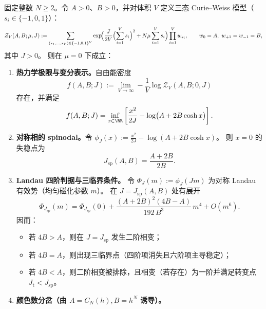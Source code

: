 \begin{theorem}\label{thm:xi-hdqcd-cw-tricritical}
固定整数 \(N\ge 2\)。令 \(A>0\)、\(B>0\)，并对体积 \(V\) 定义三态 Curie--Weiss 模型（\(s_i\in\{-1,0,1\}\)）：
\begin{equation}\label{eq:xi-hdqcd-cw-partition}
\mathcal Z_{V}(A,B;\mu,J)
:=
\sum_{(s_1,\dots,s_V)\in\{-1,0,1\}^{V}}
\exp\!\Bigl(\frac{J}{2V}\Bigl(\sum_{i=1}^{V}s_i\Bigr)^{2}+N\mu\sum_{i=1}^{V}s_i\Bigr)
\prod_{i=1}^{V} w_{s_i},
\qquad
w_0=A,\ w_{+1}=w_{-1}=B,
\end{equation}
其中 \(J>0\)。
则在 \(\mu=0\) 下成立：
\begin{enumerate}
  \item \textbf{热力学极限与变分表示。}自由能密度
  \[
  f(A,B;J):=\lim_{V\to\infty}-\frac{1}{V}\log\mathcal Z_V(A,B;0,J)
  \]
  存在，并满足
  \begin{equation}\label{eq:xi-hdqcd-cw-variational}
  f(A,B;J)=\inf_{x\in\RR}\left[\frac{x^{2}}{2J}-\log\bigl(A+2B\cosh x\bigr)\right].
  \end{equation}
  \item \textbf{对称相的 spinodal。}令
  \(
  \phi_J(x):=\frac{x^{2}}{2J}-\log(A+2B\cosh x)
  \)。
  则 \(x=0\) 的失稳点为
  \begin{equation}\label{eq:xi-hdqcd-cw-spinodal}
  J_{\mathrm{sp}}(A,B)=\frac{A+2B}{2B}.
  \end{equation}
  \item \textbf{Landau 四阶判据与三临界条件。}
  令 \(\Phi_J(m):=\phi_J(Jm)\) 为对称 Landau 有效势（均匀磁化参数 \(m\)）。
  在 \(J=J_{\mathrm{sp}}(A,B)\) 处有展开
  \begin{equation}\label{eq:xi-hdqcd-cw-landau-quartic}
  \Phi_{J_{\mathrm{sp}}}(m)=\Phi_{J_{\mathrm{sp}}}(0)
  +\frac{(A+2B)^{2}(4B-A)}{192\,B^{3}}\,m^{4}
  +O(m^{6}).
  \end{equation}
  因而：
  \begin{itemize}
    \item 若 \(4B>A\)，则在 \(J=J_{\mathrm{sp}}\) 发生二阶相变；
    \item 若 \(4B=A\)，则出现三临界点（四阶项消失且六阶项主导稳定）；
    \item 若 \(4B<A\)，则二阶相变被排除，且相变（若存在）为一阶并满足转变点 \(J_{\mathrm{t}}<J_{\mathrm{sp}}\)。
  \end{itemize}
  \item \textbf{颜色数分岔（由 \(A=C_N(h),B=h^{N}\) 诱导）。}

\end{enumerate}
\end{theorem}
